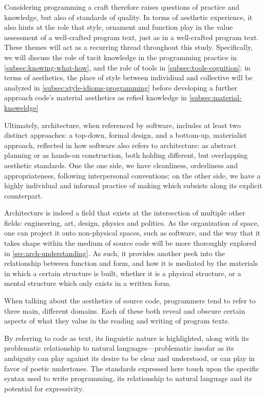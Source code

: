 Considering programming a craft therefore raises questions of practice and knowledge, but also of standards of quality. In terms of aesthetic experience, it also hints at the role that style, ornament and function play in the value assessment of a well-crafted program text, just as in a well-crafted program text. These themes will act as a recurring thread throughout this study. Specifically, we will discuss the role of tacit knowledge in the programming practice in \ref{subsec:knowing-what-how}, and the role of tools in \ref{subsec:tools-cognition}; in terms of aesthetics, the place of style between individiual and collective will be analyzed in \ref{subsec:style-idioms-programming} before developing a further approach code's material aesthetics as refied knowledge in \ref{subsec:material-knoweldge}

Ultimately, architecture, when referenced by software, includes at least two distinct approaches: a top-down, formal design, and a bottom-up, materialist approach, reflected in how software also refers to architecture: as abstract planning or as hands-on construction, both holding different, but overlapping aesthetic standards. One the one side, we have cleanliness, orderliness and appropriateness, following interpersonal conventions; on the other side, we have a highly individual and informal practice of making which subsists along its explicit counterpart.

Architecture is indeed a field that exists at the intersection of multiple other fields: engineering, art, design, physics and politics. As the organization of space, one can project it onto non-physical spaces, such as software, and the way that it takes shape within the medium of source code will be more thoroughly explored in \ref{sec:arch-understanding}. As such, it provides another peek into the relationship between function and form, and how it is mediated by the materials in which a certain structure is built, whether it is a physical structure, or a mental structure which only exists in a written form.

\spacersmall

When talking about the aesthetics of source code, programmers tend to refer to three main, different domains. Each of these both reveal and obscure certain aspects of what they value in the reading and writing of program texts.

By referring to code as text, its linguistic nature is highlighted, along with its problematic relationship to natural languages—problematic insofar as its ambiguity can play against its desire to be clear and understood, or can play in favor of poetic undertones. The standards expressed here touch upon the specific syntax used to write programming, its relationship to natural language and its potential for expressivity.

